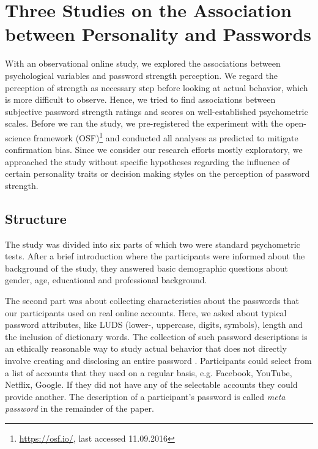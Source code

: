 \section{Three Studies on the Association between Personality and Passwords}
With an observational online study, we explored the associations between psychological variables and password strength perception. We regard the perception of strength as necessary step before looking at actual behavior, which is more difficult to observe. Hence, we tried to find associations between subjective password strength ratings and scores on well-established psychometric scales. Before we ran the study, we pre-registered the experiment with the open-science framework (OSF)\footnote{\url{https://osf.io/}, last accessed 11.09.2016} and conducted all analyses as predicted to mitigate confirmation bias. Since we consider our research efforts mostly exploratory, we approached the study without specific hypotheses regarding the influence of certain personality traits or decision making styles on the perception of password strength.

\subsection{Structure}
The study was divided into six parts of which two were standard psychometric tests. After a brief introduction where the participants were informed about the background of the study, they answered basic demographic questions about gender, age, educational and professional background. %

The second part was about collecting characteristics about the passwords that our participants used on real online accounts. Here, we asked about typical password attributes, like LUDS (lower-, uppercase, digits, symbols), length and the inclusion of dictionary words. The collection of such password descriptions is an ethically reasonable way to study actual behavior that does not directly involve creating and disclosing an entire password \cite{VonZezschwitz2013SurvivalShortest}. Participants could select from a list of accounts that they used on a regular basis, e.g. Facebook, YouTube, Netflix, Google. If they did not have any of the selectable accounts they could provide another. The description of a participant's password is called \textit{meta password} in the remainder of the paper. 


